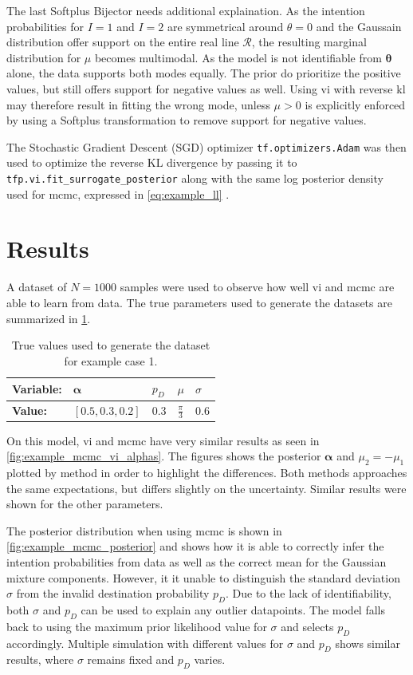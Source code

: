 The last Softplus Bijector needs additional explaination. As the intention probabilities for $I=1$ and $I=2$ are symmetrical around $\theta=0$ and the Gaussain distribution offer support on the entire real line $\mathcal{R}$, the resulting marginal distribution for $\mu$ becomes multimodal. As the model is not identifiable from $\boldsymbol{\theta}$ alone, the data supports both modes equally. The prior do prioritize the positive values, but still offers support for negative values as well.  Using \acrshort{vi} with reverse \acrshort{kl} may therefore result in fitting the wrong mode, unless $\mu > 0$ is explicitly enforced by using a Softplus transformation to remove support for negative values. 

The Stochastic Gradient Descent (SGD) optimizer \texttt{tf.optimizers.Adam} was then used to optimize the reverse KL divergence by passing it to \texttt{tfp.vi.fit\_surrogate\_posterior} along with the same log posterior density used for \acrshort{mcmc}, expressed in \cref{eq:example_ll} \cite{tensorflow2015-whitepaper}. 

\section{Results}
A dataset of $N=1000$ samples were used to observe how well \acrshort{vi} and \acrshort{mcmc} are able to learn from data. The true parameters used to generate the datasets are summarized in \cref{tbl:example_params}.
\begin{table}[h]
\centering
\begin{tabular}{lllll}
\textbf{Variable:}   & $\boldsymbol{\alpha}$ & $p_D$ & $\mu$                  & $\sigma$         \\ \hline
\textbf{Value:} & $[0.5, 0.3, 0.2]$     & $0.3$ & $\frac{\pi}{3}$ & $0.6$ \\
\end{tabular}
\caption{True values used to generate the dataset for example case 1.}
\label{tbl:example_params}
\end{table}

On this model, \acrshort{vi} and \acrshort{mcmc} have very similar results as seen in \cref{fig:example_mcmc_vi_alphas}. The figures shows the posterior $\boldsymbol{\alpha}$ and $\mu_2=-\mu_1$ plotted by method in order to highlight the differences. Both methods approaches the same expectations, but differs slightly on the uncertainty. Similar results were shown for the other parameters. 

The posterior distribution when using \acrshort{mcmc} is shown in \cref{fig:example_mcmc_posterior} and shows how it is able to correctly infer the intention probabilities from data as well as the correct mean for the Gaussian mixture components. However, it it unable to distinguish the standard deviation $\sigma$ from the invalid destination probability $p_D$. Due to the lack of identifiability, both $\sigma$ and $p_D$ can be used to explain any outlier datapoints. The model falls back to using the maximum prior likelihood value for $\sigma$ and selects $p_D$ accordingly. Multiple simulation with different values for $\sigma$ and $p_D$ shows similar results, where $\sigma$ remains fixed and $p_D$ varies.

